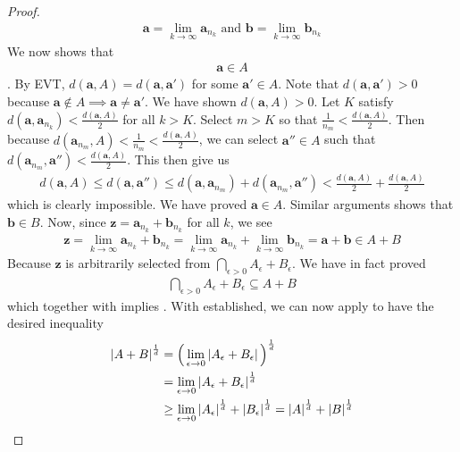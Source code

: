 \documentclass{report}
\begin{document}
\begin{proof}
\begin{align*}
\textbf{a}=\lim_{k\to \infty}\textbf{a}_{n_k}\text{ and }\textbf{b}=\lim_{k\to \infty}\textbf{b}_{n_k}
\end{align*}
We now shows that 
\begin{align}
 \textbf{a}\in A
\end{align}
. By EVT, $d(\textbf{a},A)=d(\textbf{a},\textbf{a}')$ for some $\textbf{a}'\in A$. Note that $d(\textbf{a},\textbf{a}')>0$ because $\textbf{a}\not\in A\implies \textbf{a}\neq \textbf{a}'$. We have shown $d(\textbf{a},A)>0$. Let $K$ satisfy $d(\textbf{a},\textbf{a}_{n_k})< \frac{d(\textbf{a},A)}{2}$ for all $k>K$. Select $m>K$ so that  $\frac{1}{n_m}< \frac{d(\textbf{a},A)}{2}$. Then because $d(\textbf{a}_{n_m},A)< \frac{1}{n_m}< \frac{d(\textbf{a},A)}{2}$, we can select $\textbf{a}'' \in A$ such that $d(\textbf{a}_{n_m},\textbf{a}'')< \frac{d(\textbf{a},A)}{2}$. This then give us 
\begin{align*}
d(\textbf{a},A)\leq d(\textbf{a},\textbf{a}'')\leq d(\textbf{a},\textbf{a}_{n_m})+ d(\textbf{a}_{n_m},\textbf{a}'')< \frac{d(\textbf{a},A)}{2}+ \frac{d(\textbf{a},A)}{2}
\end{align*}
which is clearly impossible. We have proved $\textbf{a} \in A$. Similar arguments shows that $\textbf{b} \in B$. Now, since $\textbf{z}=\textbf{a}_{n_k}+\textbf{b}_{n_k}$ for all $k$, we see 
\begin{align*}
\textbf{z}=\lim_{k\to \infty}\textbf{a}_{n_k}+\textbf{b}_{n_k}=\lim_{k\to \infty}\textbf{a}_{n_k}+\lim_{k\to \infty}\textbf{b}_{n_k}=\textbf{a}+\textbf{b} \in A+B
\end{align*}
Because $\textbf{z}$ is arbitrarily selected from $\bigcap_{\epsilon >0}A_\epsilon +B_\epsilon $. We have in fact proved 
\begin{align*}
\bigcap_{\epsilon >0}A_\epsilon +B_\epsilon  \subseteq A+B
\end{align*}
which together with  implies . With  established, we can now apply   to have the desired inequality 
\begin{align*}
  \left|A+B\right|^{\frac{1}{d}}&=\Big(\lim_{\epsilon \to 0} \left|A_\epsilon +B_\epsilon\right|  \Big)^{\frac{1}{d}}\\
  &=\lim_{\epsilon \to 0}\left|A_\epsilon +B_\epsilon \right|^{\frac{1}{d}}\\
  &\geq \lim_{\epsilon \to 0}\left|A_\epsilon \right|^{\frac{1}{d}}+ \left|B_\epsilon \right|^{\frac{1}{d}}= \left|A\right|^{\frac{1}{d}}+ \left|B\right|^{\frac{1}{d}}
\end{align*}
\end{proof}
\end{document}
